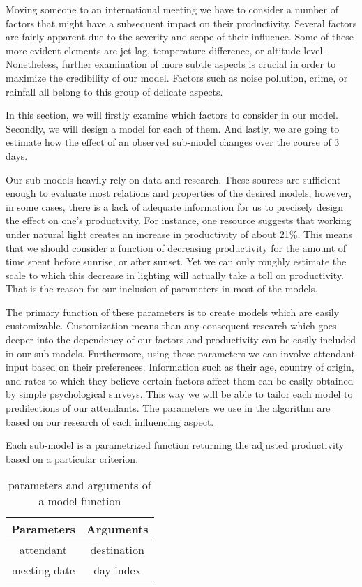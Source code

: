 Moving someone to an international meeting we have to consider a number of factors that might have a subsequent impact on their productivity. Several factors are fairly apparent due to the severity and scope of their influence. Some of these more evident elements are jet lag, temperature difference, or altitude level. Nonetheless, further examination of more subtle aspects is crucial in order to maximize the credibility of our model. Factors such as noise pollution, crime, or rainfall all belong to this group of delicate aspects. 

In this section, we will firstly examine which factors to consider in our model. Secondly, we will design a model for each of them. And lastly, we are going to estimate how the effect of an observed sub-model changes over the course of 3 days.

Our sub-models heavily rely on data and research. These sources are sufficient enough to evaluate most relations and properties of the desired models, however, in some cases, there is a lack of adequate information for us to precisely design the effect on one's productivity. For instance, one resource \cite{daylight2002} suggests that working under natural light creates an increase in productivity of about 21\%. This means that we should consider a function of decreasing productivity for the amount of time spent before sunrise, or after sunset. Yet we can only roughly estimate the scale to which this decrease in lighting will actually take a toll on productivity. That is the reason for our inclusion of parameters in most of the models.

The primary function of these parameters is to create models which are easily customizable. Customization means than any consequent research which goes deeper into the dependency of our factors and productivity can be easily included in our sub-models. Furthermore, using these parameters we can involve attendant input based on their preferences. Information such as their age, country of origin, and rates to which they believe certain factors affect them can be easily obtained by simple psychological surveys. This way we will be able to tailor each model to predilections of our attendants. The parameters we use in the algorithm are based on our research of each influencing aspect.

Each sub-model is a parametrized function returning the adjusted productivity based on a particular criterion.

\begin{table}[h!]
\centering
\begin{tabular}{c|c}
Parameters & Arguments \\
\hline \hline
attendant & destination \\
meeting date & day index \\
\end{tabular}
\caption{parameters and arguments of a model function}
\label{table:model-function}
\end{table}

